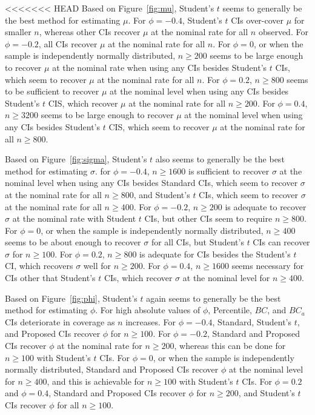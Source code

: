 \documentclass[12pt, letterpaper, titlepage]{article}
\begin{document}
<<<<<<< HEAD
Based on Figure~\ref{fig:mu}, Student's $t$ seems to generally
be the best method for estimating $\mu$.
For $\phi = -0.4$, Student's $t$ CIs over-cover 
$\mu$ for smaller $n$, whereas other CIs recover $\mu$ at the
nominal rate for all $n$ observed. For 
$\phi = -0.2$, 
all CIs recover $\mu$ at the nominal rate for all $n$. For $\phi = 0$, or when the 
sample is independently normally distributed, $n \geq 200$ seems to 
be large enough to recover $\mu$ at the nominal rate when using any CIs
 besides Student's $t$ CIs, which seem to recover $\mu$ at the nominal rate for
  all $n$.
For $\phi = 0.2$, $n \geq 800$ seems to be sufficient to recover $\mu$
at the nominal level when using
any CIs besides Student's $t$ CIS, which recover $\mu$ at the nominal
 rate for all $n \geq 200$.
For $\phi = 0.4$, $n \geq 3200$ seems to be large enough to recover $\mu$
at the nominal level when using
any CIs besides Student's $t$ CIS, which seem to recover $\mu$ at the nominal
 rate for all $n \geq 800$.

Based on Figure~\ref{fig:sigma}, Student's $t$ also seems to generally
be the best method for estimating $\sigma$.
for $\phi = -0.4$, $n \geq 1600$ is sufficient to recover $\sigma$
at the nominal level when using
any CIs besides Standard CIs, which seem to recover $\sigma$ at the nominal 
rate for all $n \geq 800$, and Student's $t$ CIs, which seem to recover $\sigma$
at the nominal rate for all $n \geq 400$. For $\phi = -0.2$, $n \geq 200$ is 
adequate to recover $\sigma$ at the nominal rate with Student $t$ CIs, 
but other CIs seem to require $n \geq 800$. For $\phi = 0$, or when the sample
is independently normally distributed, $n \geq 400$ seems to be about enough
to recover $\sigma$ for all CIs, but Student's $t$ CIs can recover $\sigma$ for
$n \geq 100$. For $\phi = 0.2$, $n \geq 800$ is adequate for CIs besides the
Student's $t$ CI, which recovers $\sigma$ well for $n \geq 200$. For 
$\phi  = 0.4$, $n \geq 1600$ seems necessary for CIs other that Student's $t$ 
CIs, which recover $\sigma$ at the nominal level for $n \geq 400$.


Based on Figure~\ref{fig:phi}, Student's $t$ again seems to generally
be the best method for estimating $\phi$. For high absolute values of $\phi$, 
Percentile, $BC$, and $BC_a$ CIs
deteriorate in coverage as $n$ increases. For $\phi = -0.4$, Standard, Student's
$t$, and Proposed CIs recover $\phi$ for $n \geq 100$. For $\phi = -0.2$, 
Standard and Proposed CIs recover $\phi$ at the nominal rate for $n \geq 200$, 
whereas this can be done for $n \geq 100$ with Student's $t$ CIs. For $\phi = 
0$, or when the sample
is independently normally distributed, Standard and Proposed CIs recover 
$\phi$ at the nominal level  for $n \geq 400$, and this is achievable for 
$n \geq 100$ with Student's $t$ CIs. For $\phi = 0.2$ and $\phi = 0.4$, Standard 
and Proposed CIs recover $\phi$ for $n \geq 200$, and Student's $t$ CIs 
recover $\phi$ for all $n \geq 100$.
\end{document}
